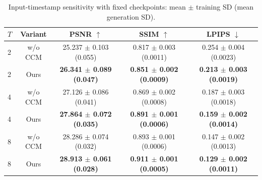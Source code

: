 \begin{table}[H]
\centering\small
\setlength{\tabcolsep}{4pt}
\caption{Input-timestamp sensitivity with fixed checkpoints: mean $\pm$ training SD (mean generation SD).}
\label{tab:seed-inputs}
\begin{tabular}{@{}lcccc@{}}
\toprule
$T$ & Variant & PSNR $\uparrow$ & SSIM $\uparrow$ & LPIPS $\downarrow$ \\
\midrule
2 & w/o CCM & 25.237 $\pm$ 0.103 (0.055) & 0.817 $\pm$ 0.003 (0.0011) & 0.254 $\pm$ 0.004 (0.0023) \\
2 & Ours & \textbf{26.341 $\pm$ 0.089 (0.047)} & \textbf{0.851 $\pm$ 0.002 (0.0009)} & \textbf{0.213 $\pm$ 0.003 (0.0019)} \\
4 & w/o CCM & 27.126 $\pm$ 0.086 (0.041) & 0.869 $\pm$ 0.002 (0.0008) & 0.187 $\pm$ 0.003 (0.0018) \\
4 & Ours & \textbf{27.864 $\pm$ 0.072 (0.035)} & \textbf{0.891 $\pm$ 0.001 (0.0006)} & \textbf{0.159 $\pm$ 0.002 (0.0014)} \\
8 & w/o CCM & 28.286 $\pm$ 0.074 (0.032) & 0.893 $\pm$ 0.001 (0.0006) & 0.147 $\pm$ 0.002 (0.0013) \\
8 & Ours & \textbf{28.913 $\pm$ 0.061 (0.028)} & \textbf{0.911 $\pm$ 0.001 (0.0005)} & \textbf{0.129 $\pm$ 0.002 (0.0011)} \\
\bottomrule
\end{tabular}
\end{table}
